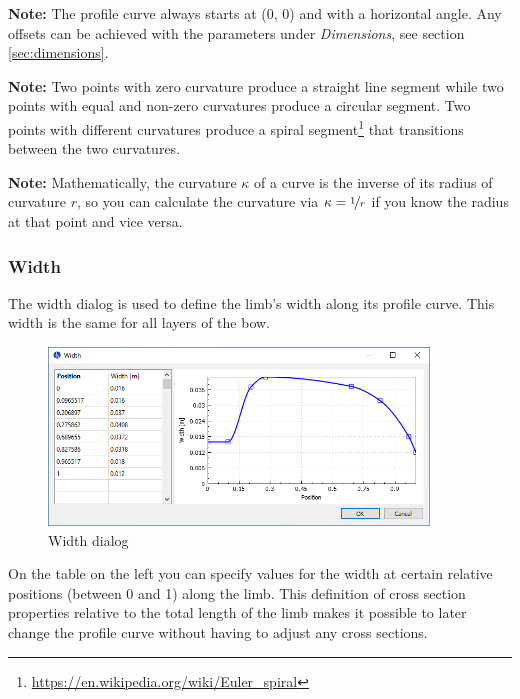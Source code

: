\documentclass[12pt]{article}
\begin{document}
\bigskip

\textbf{Note:} The profile curve always starts at (0, 0) and with a horizontal angle.
Any offsets can be achieved with the parameters under \textit{Dimensions}, see section \ref{sec:dimensions}.

\bigskip

\textbf{Note:} Two points with zero curvature produce a straight line segment while two points with equal and non-zero curvatures produce a circular segment. Two points with different curvatures produce a spiral segment\footnote{\url{https://en.wikipedia.org/wiki/Euler_spiral}} that transitions between the two curvatures.

\bigskip

\textbf{Note:} Mathematically, the curvature $\kappa$ of a curve is the inverse of its radius of curvature $r$, so you can calculate the curvature via $\kappa = \nicefrac{1}{r}$ if you know the radius at that point and vice versa.

\newpage
\subsubsection{Width}

The width dialog is used to define the limb's width along its profile curve. This width is the same for all layers of the bow.

\bigskip

\begin{figure}[H]
\centering
\includegraphics[width=0.9\textwidth]{figures/screenshots/input/width}
\caption{Width dialog}
\label{fig:width}
\end{figure}

On the table on the left you can specify values for the width at certain relative positions (between 0 and 1) along the limb. This definition of cross section properties relative to the total length of the limb makes it possible to later change the profile curve without having to adjust any cross sections.
\end{document}
